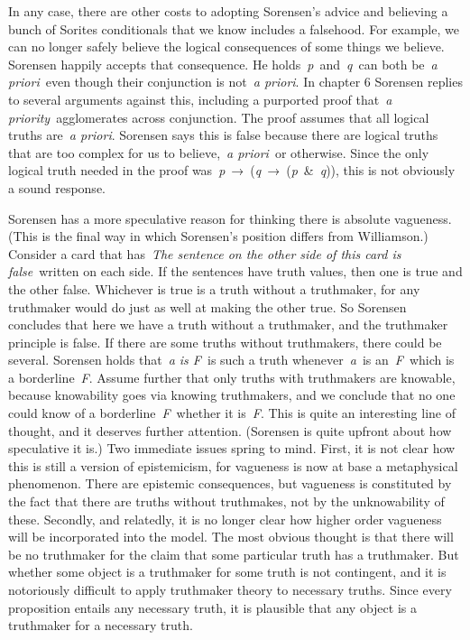 \documentclass[
  10pt,
  letterpaper,
  DIV=11,
  numbers=noendperiod,
  twoside]{scrartcl}
\begin{document}
In any case, there are other costs to adopting Sorensen's advice and
believing a bunch of Sorites conditionals that we know includes a
falsehood. For example, we can no longer safely believe the logical
consequences of some things we believe. Sorensen happily accepts that
consequence. He holds~\emph{p}~and~\emph{q}~can both be~\emph{a
priori}~even though their conjunction is not~\emph{a priori}. In chapter
6 Sorensen replies to several arguments against this, including a
purported proof that~\emph{a priority}~agglomerates across conjunction.
The proof assumes that all logical truths are~\emph{a priori}. Sorensen
says this is false because there are logical truths that are too complex
for us to believe,~\emph{a priori}~or otherwise. Since the only logical
truth needed in the proof
was~\emph{p}~→~(\emph{q}~→~(\emph{p}~\&~\emph{q})), this is not
obviously a sound response.

Sorensen has a more speculative reason for thinking there is absolute
vagueness. (This is the final way in which Sorensen's position differs
from Williamson.) Consider a card that has~\emph{The sentence on the
other side of this card is false}~written on each side. If the sentences
have truth values, then one is true and the other false. Whichever is
true is a truth without a truthmaker, for any truthmaker would do just
as well at making the other true. So Sorensen concludes that here we
have a truth without a truthmaker, and the truthmaker principle is
false. If there are some truths without truthmakers, there could be
several. Sorensen holds that~\emph{a is F}~is such a truth
whenever~\emph{a}~is an~\emph{F}~which is a borderline~\emph{F}. Assume
further that only truths with truthmakers are knowable, because
knowability goes via knowing truthmakers, and we conclude that no one
could know of a borderline~\emph{F}~whether it is~\emph{F}. This is
quite an interesting line of thought, and it deserves further attention.
(Sorensen is quite upfront about how speculative it is.) Two immediate
issues spring to mind. First, it is not clear how this is still a
version of epistemicism, for vagueness is now at base a metaphysical
phenomenon. There are epistemic consequences, but vagueness is
constituted by the fact that there are truths without truthmakes, not by
the unknowability of these. Secondly, and relatedly, it is no longer
clear how higher order vagueness will be incorporated into the model.
The most obvious thought is that there will be no truthmaker for the
claim that some particular truth has a truthmaker. But whether some
object is a truthmaker for some truth is not contingent, and it is
notoriously difficult to apply truthmaker theory to necessary truths.
Since every proposition entails any necessary truth, it is plausible
that any object is a truthmaker for a necessary truth.
\end{document}
